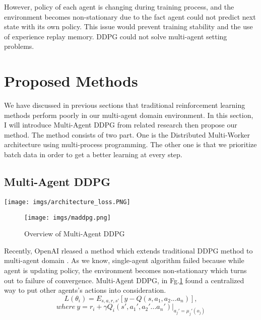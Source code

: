 \documentclass[11pt,twocolumn]{jarticle} %
\begin{document}
However, policy of each agent is changing during training process, and the environment becomes non-stationary due to the fact agent could not predict next state with its own policy. This issue would prevent training stability and the use of experience replay memory. DDPG could not solve multi-agent setting problems. \par

\section{Proposed Methods}

We have discussed in previous sections that traditional reinforcement learning methods perform poorly in our multi-agent domain environment. In this section, I will introduce Multi-Agent DDPG from related research then propose our method. The method consists of two part. One is the Distributed Multi-Worker architecture using multi-process programming. The other one is that we prioritize batch data in order to get a better learning at every step.


\subsection{Multi-Agent DDPG}


\begin{figure*}[h]
 \begin{center}
  \texttt{[image: imgs/architecture\_loss.PNG]}
  \caption{architecture}
  \label{fig:architecture}
 \end{center}
\end{figure*}

\begin{figure}[ht]
 \begin{center}
  \texttt{[image: imgs/maddpg.png]}
  \caption{Overview of Multi-Agent DDPG\cite{maddpg}}
  \label{fig:maddpg}
 \end{center}
\end{figure}


Recently, OpenAI rleased a method which extends traditional DDPG method to multi-agent domain \cite{maddpg}. As we know, single-agent algorithm failed because while agent is updating policy, the environment becomes non-stationary which turns out to failure of convergence. Multi-Agent DDPG, in Fg.\ref{fig:maddpg} found a centralized way to put other agents's actions into consideration.
\begin{equation}
L(\theta_i) = E_{s,a,r,s'}[y - Q(s, a_1, a_2 ... a_n)],  
\end{equation}
$$where\ y = r_i + \gamma{Q_i}(s', a_1', a_2' ... a_n') | _{a_j'=\mu_j'(o_j)}$$
\end{document}
